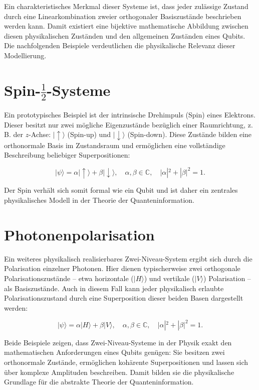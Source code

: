 Ein charakteristisches Merkmal dieser Systeme ist, dass jeder zulässige Zustand durch eine Linearkombination zweier orthogonaler Basiszustände beschrieben werden kann. Damit existiert eine bijektive mathematische Abbildung zwischen diesen physikalischen Zuständen und den allgemeinen Zuständen eines Qubits. Die nachfolgenden Beispiele verdeutlichen die physikalische Relevanz dieser Modellierung.

\section*{Spin-$\frac{1}{2}$-Systeme}

Ein prototypisches Beispiel ist der intrinsische Drehimpuls (Spin) eines Elektrons. Dieser besitzt nur zwei mögliche Eigenzustände bezüglich einer Raumrichtung, z.\,B. der $z$-Achse: $|\uparrow\rangle$ (Spin-up) und $|\downarrow\rangle$ (Spin-down). Diese Zustände bilden eine orthonormale Basis im Zustandsraum und ermöglichen eine vollständige Beschreibung beliebiger Superpositionen:

\[
|\psi\rangle = \alpha |\uparrow\rangle + \beta |\downarrow\rangle, \quad \alpha, \beta \in \mathbb{C}, \quad |\alpha|^2 + |\beta|^2 = 1.
\]

Der Spin verhält sich somit formal wie ein Qubit und ist daher ein zentrales physikalisches Modell in der Theorie der Quanteninformation.

\section*{Photonenpolarisation}

Ein weiteres physikalisch realisierbares Zwei-Niveau-System ergibt sich durch die Polarisation einzelner Photonen. Hier dienen typischerweise zwei orthogonale Polarisationszustände – etwa horizontale ($|H\rangle$) und vertikale ($|V\rangle$) Polarisation – als Basiszustände. Auch in diesem Fall kann jeder physikalisch erlaubte Polarisationszustand durch eine Superposition dieser beiden Basen dargestellt werden:

\[
|\psi\rangle = \alpha |H\rangle + \beta |V\rangle, \quad \alpha, \beta \in \mathbb{C}, \quad |\alpha|^2 + |\beta|^2 = 1.
\]

Beide Beispiele zeigen, dass Zwei-Niveau-Systeme in der Physik exakt den mathematischen Anforderungen eines Qubits genügen: Sie besitzen zwei orthonormale Zustände, ermöglichen kohärente Superpositionen und lassen sich über komplexe Amplituden beschreiben. Damit bilden sie die physikalische Grundlage für die abstrakte Theorie der Quanteninformation.



